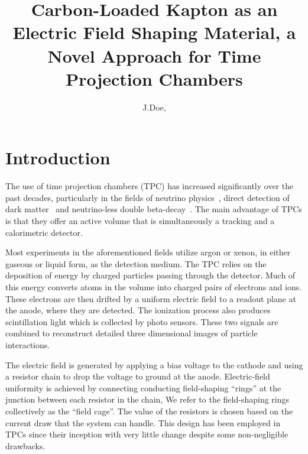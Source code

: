 \documentclass[a4paper,12pt]{article}
\title{Carbon-Loaded Kapton as an Electric Field Shaping Material, a Novel Approach for Time Projection Chambers}
\author[a,1]{J.Doe,\note{Corresponding author}}
\affiliation[a]{SLAC National Accelerator Laboratory,\\ Sand Hill Rd. Menlo Park, Ca, 94025, USA}
\affiliation[b]{Michigan State University,\\ 426 Auditorium Rd. East Lansing, Mi, 48824, USA}
\begin{document}
\listoftodos
\maketitle
\section{Introduction}
\label{sec:intro}

The use of time projection chambers (TPC) has increased significantly over the past decades, particularly in the fields of neutrino physics~\cite{Acciarri:2016ooe,Adams:2019bzt,Amerio:2004ze}, direct detection of dark matter~\cite{Aprile:2012zx,Akerib:2019fml,Aalseth:2017fik} and neutrino-less double beta-decay~\cite{Pocar:2020zqz}. 
The main advantage of TPCs is that they offer an active volume that is simultaneously a tracking and a calorimetric detector.

Most experiments in the aforementioned fields utilize argon or xenon, in either gaseous or liquid form, as the detection medium. 
The TPC relies on the deposition of energy by charged particles passing through the detector. 
Much of this energy converts atoms in the volume into charged pairs of electrons and ions. 
These electrons are then drifted by a uniform electric field to a readout plane at the anode, where they are detected. 
The ionization process also produces scintillation light which is collected by photo sensors. 
These two signals are combined to reconstruct detailed three dimensional images of particle interactions.

The electric field is generated by applying a bias voltage to the cathode and using a resistor chain to drop the voltage to ground at the anode.  
Electric-field uniformity is achieved by connecting conducting field-shaping ``rings'' at the junction between each resistor in the chain, We refer to the field-shaping rings collectively as the ``field cage''. 
The value of the resistors is chosen based on the current draw that the system can handle.
This design has been employed in TPCs since their inception with very little change despite some non-negligible drawbacks. 
\end{document}
